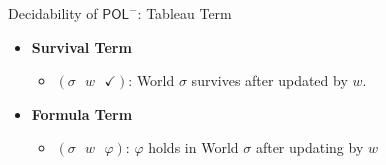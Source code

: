 \documentclass[usenames,dvipsnames]{beamer}
\newcommand{\POL}{\mathsf{POL}}
\newcommand{\regdiv}[1]{\ensuremath{\backslash} #1}
\begin{document}
             



    \begin{frame}{Decidability of $\POL^-$: Tableau Term}
    \begin{itemize}
    \setlength\itemsep{4em}
        \item<1-> \textbf{Survival Term}
        \begin{itemize}
            \item<2-> \textbf{$(\sigma~~~w~~~\checkmark)$}: World $\sigma$ survives after updated by $w$.
        \end{itemize}

        \item<3-> \textbf{Formula Term}
        \begin{itemize}
            \item<4->  \textbf{$(\sigma~~~w~~~\varphi)$}: $\varphi$ holds in World $\sigma$ after updating by $w$ 
        \end{itemize}
    \end{itemize}
\end{frame}
\end{document}
